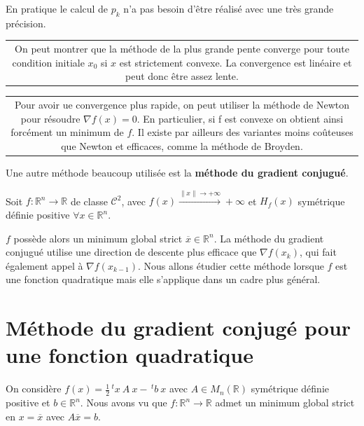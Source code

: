 \documentclass[a4paper,11pt]{article}
\newcommand{\R}{\mathbb{R}}
\newcommand{\norm}[1]{\left\lVert#1\right\rVert}
\newcommand{\tpo}[1]{\,^t#1}
\newcommand{\deffonc}[3]{#1 : #2 \longrightarrow #3}
\newcommand{\Co}{\mathcal{C}}
\theoremstyle{plain} %
\begin{document}
\begin{remark}
    En pratique le calcul de $p_k$ n'a pas besoin d'être réalisé avec
    une très grande précision.
\end{remark}

\noindent
\begin{tabular}{||c}
\begin{minipage}[c]{15cm}
        On peut montrer que la méthode de la plus grande pente converge pour toute
        condition initiale $x_0$ si $x$ est strictement convexe. La convergence
        est linéaire et peut donc être assez lente.
    \end{minipage}
\end{tabular}

\vspace{0.3cm}

\noindent
\begin{tabular}{||c}
    \begin{minipage}[c]{15cm}
        Pour avoir ue convergence plus rapide, on peut utiliser la méthode de
        Newton pour résoudre $\nabla f(x) = 0$. En particulier, si f est
        convexe on obtient ainsi forcément un minimum de $f$. Il existe par
        ailleurs des variantes moins coûteuses que Newton et efficaces, comme
        la méthode de Broyden.
    \end{minipage}
\end{tabular}

Une autre méthode beaucoup utilisée est la \textbf{méthode du gradient conjugué}.

Soit $\deffonc{f}{\R^n}{\R}$ de classe $\Co^2$, avec $f(x) \xrightarrow{\norm{x} \to +\infty} +\infty$
et $H_f(x)$ symétrique définie positive $\forall x \in \R^n$.

$f$ possède alors un minimum global strict $\overline{x} \in \R^n$. La méthode
du gradient conjugué utilise une direction de descente plus efficace que
$\nabla f(x_k)$, qui fait également appel à $\nabla f(x_{k-1})$. Nous allons
étudier cette méthode lorsque $f$ est une fonction quadratique mais elle
s'applique dans un cadre plus général.

\section{Méthode du gradient conjugé pour une fonction quadratique}

On considère $f(x) = \frac{1}{2} \tpo{x} \: A \: x - \tpo{b} \: x$ avec
$A \in M_n(\R)$ symétrique définie positive et $b \in \R^n$. Nous avons
vu que $\deffonc{f}{\R^n}{\R}$ admet un minimum global strict en $x = \overline{x}$ avec $A \overline{x} = b$.
\end{document}
